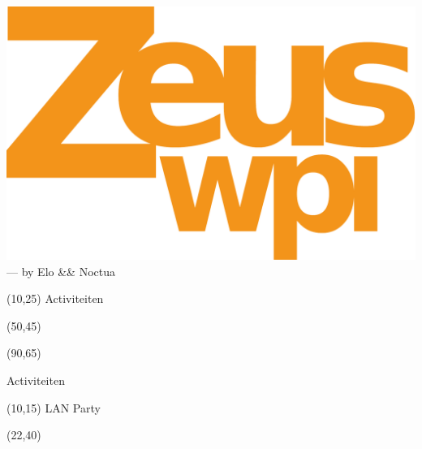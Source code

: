 \documentclass[11pt,a4paper]{beamer}
\author{Zeus WPI}
\begin{document}
\begin{frame}
  \includegraphics[width=\textwidth]{zeus_logo.pdf}\\[5mm]

  \hfill --- by Elo \&\& Noctua

\end{frame}
\begin{frame}
  \begin{textblock}{20}(10,25)
    {\Huge Activiteiten}
  \end{textblock}

  \pause
  \begin{textblock}{20}(50,45)
  \end{textblock}

  \pause
  \begin{textblock}{20}(90,65)
  \end{textblock}

\end{frame}


\begin{frame}
  \begin{center}
    {\Huge Activiteiten}
  \end{center}

\end{frame}
\begin{frame} 

  \begin{textblock}{60}(10,15)
    {\huge LAN Party}
  \end{textblock}

  \begin{textblock}{20}(22,40)
  \end{textblock}

\end{frame}
\end{document}
